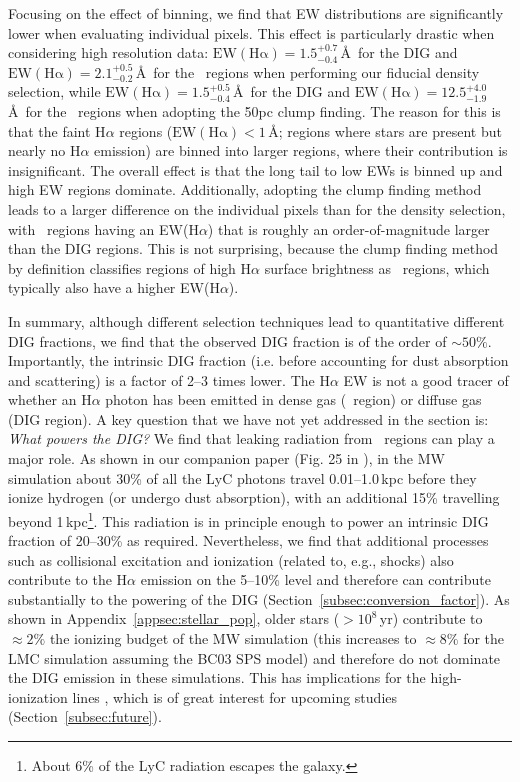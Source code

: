 \documentclass[fleqn,usenatbib]{mnras}
\newcommand\HII{\ion{H}{II}~} %
\begin{document}
Focusing on the effect of binning, we find that EW distributions are significantly lower when evaluating individual pixels. This effect is particularly drastic when considering high resolution data: $\mathrm{EW(H\alpha)}=1.5_{-0.4}^{+0.7}$\,\AA\ for the DIG and $\mathrm{EW(H\alpha)}=2.1_{-0.2}^{+0.5}$\,\AA\ for the \HII regions when performing our fiducial density selection, while $\mathrm{EW(H\alpha)}=1.5_{-0.4}^{+0.5}$\,\AA\ for the DIG and $\mathrm{EW(H\alpha)}=12.5_{-1.9}^{+4.0}$\,\AA\ for the \HII regions when adopting the 50pc clump finding. The reason for this is that the faint H$\alpha$ regions ($\mathrm{EW(H\alpha)}<1$\,\AA; regions where stars are present but nearly no H$\alpha$ emission) are binned into larger regions, where their contribution is insignificant. The overall effect is that the long tail to low EWs is binned up and high EW regions dominate. Additionally, adopting the clump finding method leads to a larger difference on the individual pixels than for the density selection, with \HII regions having an EW(H$\alpha$) that is roughly an order-of-magnitude larger than the DIG regions. This is not surprising, because the clump finding method by definition classifies regions of high H$\alpha$ surface brightness as \HII regions, which typically also have a higher EW(H$\alpha$).

In summary, although different selection techniques lead to quantitative different DIG fractions, we find that the observed DIG fraction is of the order of $\sim50\%$. Importantly, the intrinsic DIG fraction (i.e. before accounting for dust absorption and scattering) is a factor of 2--3 times lower. The H$\alpha$ EW is not a good tracer of whether an H$\alpha$ photon has been emitted in dense gas (\HII region) or diffuse gas (DIG region). A key question that we have not yet addressed in the section is: \textit{What powers the DIG?} We find that leaking radiation from \HII regions can play a major role. As shown in our companion paper (Fig. 25 in \citealt{smith21_rt}), in the MW simulation about 30\% of all the LyC photons travel 0.01--1.0\,kpc before they ionize hydrogen (or undergo dust absorption), with an additional 15\% travelling beyond 1\,kpc\footnote{About 6\% of the LyC radiation escapes the galaxy.}. This radiation is in principle enough to power an intrinsic DIG fraction of 20--30\% as required. Nevertheless, we find that additional processes such as collisional excitation and ionization (related to, e.g., shocks) also contribute to the H$\alpha$ emission on the 5--10\% level and therefore can contribute substantially to the powering of the DIG (Section~\ref{subsec:conversion_factor}). As shown in Appendix~\ref{appsec:stellar_pop}, older stars ($>10^8$\,yr) contribute to $\approx2\%$ the ionizing budget of the MW simulation (this increases to $\approx8\%$ for the LMC simulation assuming the BC03 SPS model) and therefore do not dominate the DIG emission in these simulations. This has implications for the high-ionization lines \citep[e.g.,][]{zhang17_DIG}, which is of great interest for upcoming studies (Section~\ref{subsec:future}).
\end{document}
